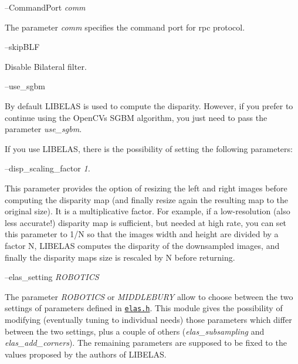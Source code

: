 --Command\+Port {\itshape comm} 
\begin{DoxyItemize}
\item The parameter {\itshape comm} specifies the command port for rpc protocol.
\end{DoxyItemize}

--skip\+B\+LF
\begin{DoxyItemize}
\item Disable Bilateral filter.
\end{DoxyItemize}

--use\+\_\+sgbm
\begin{DoxyItemize}
\item By default L\+I\+B\+E\+L\+AS is used to compute the disparity. However, if you prefer to continue using the Open\+CV\textquotesingle{}s S\+G\+BM algorithm, you just need to pass the parameter {\itshape use\+\_\+sgbm}.
\end{DoxyItemize}

If you use L\+I\+B\+E\+L\+AS, there is the possibility of setting the following parameters\+:

--disp\+\_\+scaling\+\_\+factor {\itshape 1.} 
\begin{DoxyItemize}
\item This parameter provides the option of resizing the left and right images before computing the disparity map (and finally resize again the resulting map to the original size). It is a multiplicative factor. For example, if a low-\/resolution (also less accurate!) disparity map is sufficient, but needed at high rate, you can set this parameter to 1/N so that the images width and height are divided by a factor N, L\+I\+B\+E\+L\+AS computes the disparity of the downsampled images, and finally the disparity map\textquotesingle{}s size is rescaled by N before returning.
\end{DoxyItemize}

--elas\+\_\+setting {\itshape R\+O\+B\+O\+T\+I\+CS} 
\begin{DoxyItemize}
\item The parameter {\itshape R\+O\+B\+O\+T\+I\+CS} or {\itshape M\+I\+D\+D\+L\+E\+B\+U\+RY} allow to choose between the two settings of parameters defined in \href{https://github.com/robotology/stereo-vision/tree/master/lib/elas/include/elas.h}{\tt elas.\+h}. This module gives the possibility of modifying (eventually tuning to individual needs) those parameters which differ between the two settings, plus a couple of others ({\itshape elas\+\_\+subsampling} and {\itshape elas\+\_\+add\+\_\+corners}). The remaining parameters are supposed to be fixed to the values proposed by the authors of L\+I\+B\+E\+L\+AS.
\end{DoxyItemize}

